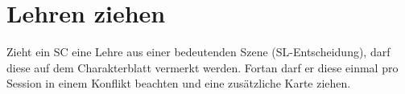 \section{Lehren ziehen}
Zieht ein SC eine Lehre aus einer bedeutenden Szene (SL-Entscheidung), darf diese auf dem Charakterblatt vermerkt werden. Fortan darf er diese einmal pro Session in einem Konflikt beachten und eine zusätzliche Karte ziehen.

